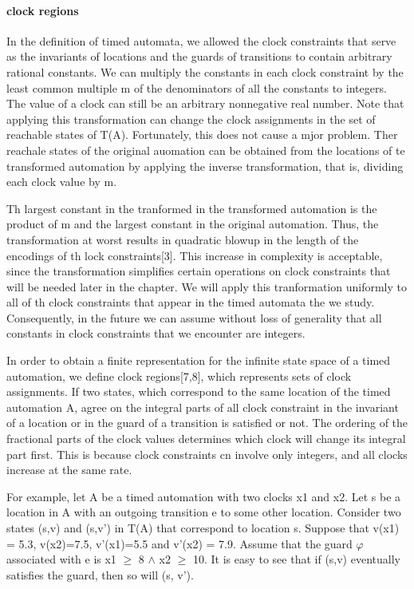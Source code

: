 \paragraph{clock regions}
In the definition	 of timed automata, we allowed the clock constraints that serve as the invariants of locations and the guards of transitions to contain arbitrary rational constants.
We can multiply the constants in each clock constraint by the least common multiple m of the denominators of all the constants to integers. The value of a clock can still be an arbitrary nonnegative real number. Note that applying this transformation can change the clock assignments in the set of reachable states of T(A). Fortunately, this does not cause a mjor problem. Ther reachale states of the original auomation can be obtained from the locations of te transformed automation by applying the inverse transformation, that is, dividing each clock value by m.


Th largest constant in the tranformed in the transformed automation is the product of m and the largest constant in the original automation. Thus, the transformation at worst results in quadratic blowup in the length of the encodings of th lock constraints[3]. This increase in complexity is acceptable, since the transformation simplifies certain operations on clock constraints that will be needed later in the chapter. We will apply this tranformation uniformly to all of th clock constraints that appear in the timed automata the we study. Consequently, in the future we can assume without loss of generality that all constants in clock constraints that we encounter are integers.

In order to obtain a finite representation for the infinite state space of a timed automation, we define clock regions[7,8], which represents sets of clock assignments. If two states, which correspond to the  same location of the timed automation A, agree on the integral parts of all clock constraint in the invariant of a location or in the guard of a transition is satisfied or not. The ordering of the fractional parts of the clock values determines which clock will change its integral part first. This is because clock constraints cn involve only integers, and all clocks increase at the same rate.

For example, let A be a timed automation with two clocks x1 and x2. Let s be a location in A with an outgoing transition e to some other location. Consider two states (s,v) and (s,v') in T(A) that correspond to location s. Suppose that v(x1) = 5.3, v(x2)=7.5, v'(x1)=5.5 and v'(x2) = 7.9. Assume that the guard $\varphi$ associated with e is x1 $\geq$ 8 $\wedge$ x2 $\geq$ 10. It is easy to see that if (s,v) eventually satisfies the guard, then so will (s, v').

